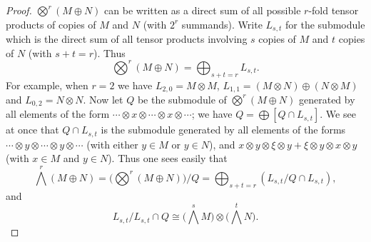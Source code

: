 \begin{proof}
$\bigotimes^r(M \oplus N)$ can be written as a direct sum of all possible $r$-fold tensor
products of copies of $M$ and $N$ (with $2^r$ summands). Write $L_{s,t}$ for the
submodule which is the direct sum of all tensor products involving $s$ copies of
$M$ and $t$ copies of $N$ (with $s + t = r$). Thus
\[
  \bigotimes^r(M \oplus N) = \bigoplus_{s + t = r} L_{s,t}.
\]
For example, when $r = 2$ we have $L_{2,0} = M \otimes M$,
$L_{1,1} = (M \otimes N) \oplus (N \otimes M)$ and $L_{0,2} = N \otimes N$. Now let $Q$ be the
submodule of $\bigotimes^r(M \oplus N)$ generated by all elements of the form
$\cdots \otimes x \otimes \cdots \otimes x \otimes \cdots$; we have
$Q = \bigoplus[Q \cap L_{s,t}]$. We see at once that $Q \cap L_{s,t}$ is the submodule generated by
all elements of the forms $\cdots \otimes y \otimes \cdots \otimes y \otimes \cdots$ (with either $y \in M$
or $y \in N$), and $x \otimes y \otimes \xi \otimes y + \xi \otimes y \otimes x \otimes y$ (with $x \in M$ and
$y \in N$). Thus one sees easily that
\[
  \bigwedge^r (M \oplus N) = \Big(\bigotimes^r(M \oplus N)\Big)/Q = \bigoplus_{s + t = r}
      (L_{s,t}/Q \cap L_{s,t}),
\]
and
\[
  L_{s,t}/L_{s,t} \cap Q \cong \Big(\bigwedge^s M\Big) \otimes \Big(\bigwedge^t N\Big).
\]
\end{proof}

